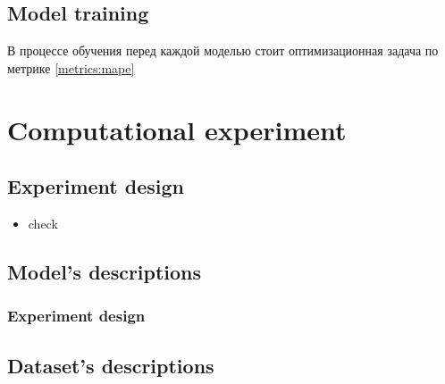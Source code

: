 \documentclass{article}
\begin{document}
\subsection{Model training}

В процессе обучения перед каждой моделью стоит оптимизационная задача по метрике \ref{metrics:mape}\cite{HydrologicWaterQuality2015,kratzertRainfallRunoffModelling2018}


\section{Computational experiment}
\label{sec:experiment}

\subsection{Experiment design}

\begin{itemize}
    \item check
\end{itemize}

\subsection{Model's descriptions}
\label{sec:experiment:models_descriptions}

\subsubsection{Experiment design}


\subsection{Dataset's descriptions}
\label{sec:experiment:datasets_descriptions}






\end{document}

